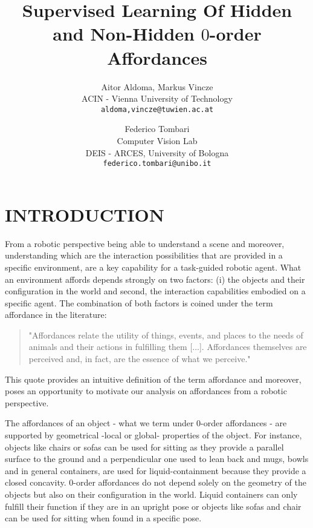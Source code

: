 \documentclass[a4paper, 10pt, conference]{ieeeconf}      %
\title{\LARGE \bf
Supervised Learning Of Hidden and Non-Hidden $0$-order Affordances
}
\author{Aitor Aldoma, Markus Vincze\\
ACIN - Vienna University of Technology\\
{\tt\small {aldoma,vincze}@tuwien.ac.at}
\and
Federico Tombari\\
Computer Vision Lab\\
DEIS - ARCES, University of Bologna\\
{\tt\small {federico.tombari}@unibo.it}
}
\begin{document}
\maketitle
\thispagestyle{empty}
\pagestyle{empty}


\begin{abstract}


\end{abstract}


\section{INTRODUCTION}

From a robotic perspective being able to understand a
scene and moreover, understanding which are the interaction
possibilities that are provided in a specific environment, are
a key capability for a task-guided robotic agent. What an
environment affords depends strongly on two factors: (i) the
objects and their configuration in the world and second,
the interaction capabilities embodied on a specific agent.
The combination of both factors is coined under the term
affordance in the literature:

\begin{quote} "Affordances relate the utility of things, events, and
places to the needs of animals and their actions in fulfilling
them [...]. Affordances themselves are perceived and, in
fact, are the essence of what we perceive." \end{quote}

This quote provides an intuitive definition of the term affordance
and moreover, poses an opportunity to motivate our analysis on
affordances from a robotic perspective.	

The affordances of an object - what we term under $0$-order affordances -
are supported by geometrical -local or global- properties of the object. For instance, objects like chairs or sofas
can be used for sitting as they provide a parallel surface to the ground and a perpendicular one used to lean back and mugs, bowls
and in general containers, are used for liquid-containment because they provide a closed concavity. $0$-order affordances
do not depend solely on the geometry of the objects but also on their configuration in the world. Liquid containers can only
fulfill their function if they are in an upright pose or objects like sofas and chair can be used for sitting when found
in a specific pose. 
\end{document}
